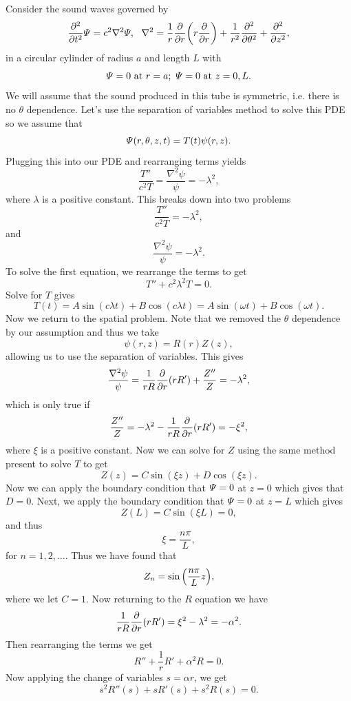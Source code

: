 \documentclass[12pt]{report}
\begin{document}
\begin{solution}
    
    \noindent
    Consider the sound waves governed by
    \[
        \frac{\partial^{2} }{\partial t^{2}} \varPsi = c^2 \nabla^2 \varPsi, ~~ \nabla^2= \frac{1}{r}\frac{\partial }{\partial r}{\left(r\frac{\partial }{\partial r}\right)} + \frac{1}{r^2}\frac{\partial^{2} }{\partial \theta^{2}} + \frac{\partial^{2} }{\partial z^{2}},
    \] 
    in a circular cylinder of radius $a$ and length $L$ with
    \[
        \varPsi = 0 ~\text{at}~r=a;~\varPsi=0 ~\text{at}~z=0,L.
    \]
    We will assume that the sound produced in this tube is symmetric, i.e. there is no $\theta$ dependence. Let's use the separation of variables method to solve this PDE so we assume that 
    \[
        \varPsi(r,\theta,z,t) = T(t)\psi (r,z).        
    \]
    Plugging this into our PDE and rearranging terms yields
    \[
        \frac{T''}{c^2T} = \frac{\nabla^2 \psi}{\psi} = -\lambda^2,
    \]
    where $\lambda$ is a positive constant. This breaks down into two problems
    \[
        \frac{T''}{c^2T} = -\lambda^2,
    \]
    and
    \[
        \frac{\nabla^2 \psi}{\psi} = -\lambda^2.
    \]
    To solve the first equation, we rearrange the terms to get
    \[
        T'' + c^2\lambda^2 T = 0.
    \]
    Solve for $T$ gives
    \[
        T(t) = A\sin(c\lambda t) + B\cos(c\lambda t) = A\sin(\omega t) + B\cos(\omega t).
    \]
    Now we return to the spatial problem. Note that we removed the $\theta$ dependence by our assumption and thus we take
    \[
        \psi(r,z) = R(r)Z(z),
    \]
    allowing us to use the separation of variables. This gives
    \[
        \frac{\nabla^2 \psi}{\psi} = \frac{1}{rR}\frac{\partial }{\partial r}{\left(rR'\right)} + \frac{Z''}{Z} = - \lambda^2,
    \]
    which is only true if
    \[
        \frac{Z''}{Z} = - \lambda^2 - \frac{1}{rR}\frac{\partial }{\partial r}(rR') = -\xi^2,
    \]
    where $\xi$ is a positive constant. Now we can solve for $Z$ using the same method present to solve $T$ to get
    \[
        Z(z) = C\sin(\xi z) + D\cos(\xi z).
    \]
    Now we can apply the boundary condition that $\varPsi = 0 $ at $z=0$ which gives that $D=0$. Next, we apply the boundary condition that $\varPsi =0$ at $z=L$ which gives
    \[
        Z(L) = C\sin(\xi L) = 0,
    \] 
    and thus
    \[
        \xi = \frac{n \pi}{L},
    \]
    for $n=1,2,\dots$. Thus we have found that
    \[
        Z_n = \sin{\left(\frac{n\pi}{L}z\right)},
    \]
    where we let $C=1$. Now returning to the $R$ equation we have
    \[
        \frac{1}{rR}\frac{\partial }{\partial r}(rR') = \xi^2 - \lambda^2 = -\alpha^2.
    \]
    Then rearranging the terms we get
    \[
        R'' + \frac{1}{r}R' + \alpha^2 R = 0.
    \]
    Now applying the change of variables $s=\alpha r$, we get
    \[
        s^2 R''(s) + sR'(s) + s^2R(s) = 0.
\]
\end{solution}
\end{document}
